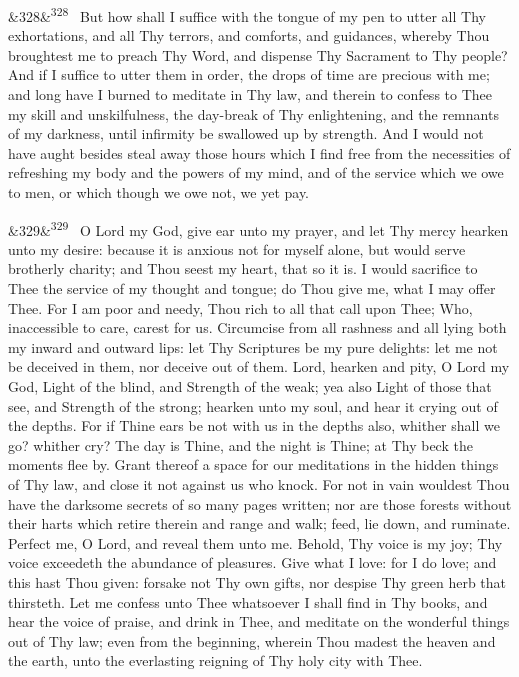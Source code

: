 \documentclass[12pt]{article}
\newcommand{\para}[1][]{\par\noindent\ifx&#1&\else\textsuperscript{\footnotesize #1}~\fi}
\begin{document}
\para[328] But how shall I suffice with the tongue of my pen to utter all Thy exhortations, and all Thy terrors, and comforts, and guidances, whereby Thou broughtest me to preach Thy Word, and dispense Thy Sacrament to Thy people? And if I suffice to utter them in order, the drops of time are precious with me; and long have I burned to meditate in Thy law, and therein to confess to Thee my skill and unskilfulness, the day-break of Thy enlightening, and the remnants of my darkness, until infirmity be swallowed up by strength. And I would not have aught besides steal away those hours which I find free from the necessities of refreshing my body and the powers of my mind, and of the service which we owe to men, or which though we owe not, we yet pay.

\para[329] O Lord my God, give ear unto my prayer, and let Thy mercy hearken unto my desire: because it is anxious not for myself alone, but would serve brotherly charity; and Thou seest my heart, that so it is. I would sacrifice to Thee the service of my thought and tongue; do Thou give me, what I may offer Thee. For I am poor and needy, Thou rich to all that call upon Thee; Who, inaccessible to care, carest for us. Circumcise from all rashness and all lying both my inward and outward lips: let Thy Scriptures be my pure delights: let me not be deceived in them, nor deceive out of them. Lord, hearken and pity, O Lord my God, Light of the blind, and Strength of the weak; yea also Light of those that see, and Strength of the strong; hearken unto my soul, and hear it crying out of the depths. For if Thine ears be not with us in the depths also, whither shall we go? whither cry? The day is Thine, and the night is Thine; at Thy beck the moments flee by. Grant thereof a space for our meditations in the hidden things of Thy law, and close it not against us who knock. For not in vain wouldest Thou have the darksome secrets of so many pages written; nor are those forests without their harts which retire therein and range and walk; feed, lie down, and ruminate. Perfect me, O Lord, and reveal them unto me. Behold, Thy voice is my joy; Thy voice exceedeth the abundance of pleasures. Give what I love: for I do love; and this hast Thou given: forsake not Thy own gifts, nor despise Thy green herb that thirsteth. Let me confess unto Thee whatsoever I shall find in Thy books, and hear the voice of praise, and drink in Thee, and meditate on the wonderful things out of Thy law; even from the beginning, wherein Thou madest the heaven and the earth, unto the everlasting reigning of Thy holy city with Thee.
\end{document}
